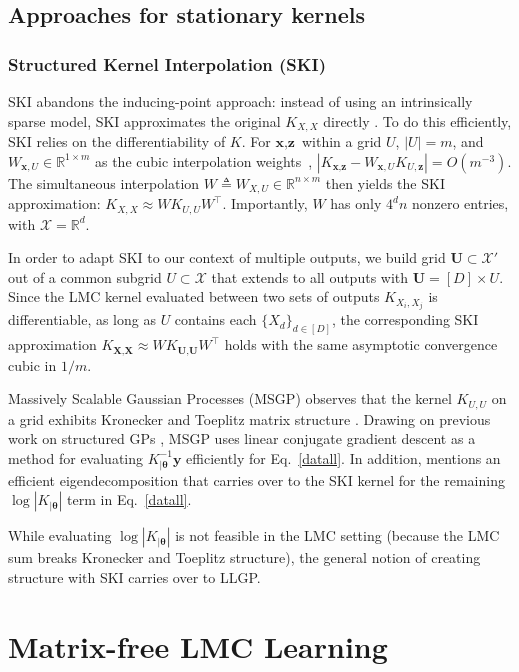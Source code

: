 \documentclass{article}
\def\bsth{{\boldsymbol\theta}}
\def \R {\mathbb{R}}
\def\Tx{\textbf{x}}
\def\TX{\textbf{X}}
\def\TU{\textbf{U}}
\def\Ty{\textbf{y}}
\def\Tz{\textbf{z}}
\newcommand{\card}[1]{\left\vert{#1}\right\vert}
\newcommand{\abs}[1]{\left|#1\right|}
\def \mcX {\mathcal{X}}
\begin{document}
\subsection{Approaches for stationary kernels}

\subsubsection{Structured Kernel Interpolation (SKI)}\label{ski-section}

SKI abandons the inducing-point approach: instead of using an intrinsically sparse model, SKI approximates the original $K_{X,X}$ directly \cite{kiss-gp}. To do this efficiently, SKI relies on the differentiability of $K$. For $\Tx,\Tz$ within a grid $U$, $\card{U}=m$, and $W_{\Tx,U}\in\R^{1\times m}$ as the cubic interpolation weights~\cite{keys1981cubic}, $\abs{K_{\Tx,\Tz}-W_{\Tx,U}K_{U,\Tz}}=O(m^{-3})$. The simultaneous interpolation $W\triangleq W_{X,U}\in\R^{n\times m}$ then yields the SKI approximation: $K_{X,X}\approx WK_{U,U}W^\top$. Importantly, $W$ has only $4^dn$ nonzero entries, with $\mcX=\R^d$.

In order to adapt SKI to our context of multiple outputs, we build grid $\TU\subset\mcX'$ out of a common subgrid $U\subset\mcX$ that extends to all outputs with $\TU = [D]\times U$. Since the LMC kernel evaluated between two sets of outputs $K_{X_i,X_j}$ is differentiable, as long as $U$ contains each $\{X_d\}_{d\in[D]}$, the corresponding SKI approximation $K_{\TX,\TX}\approx WK_{\TU,\TU}W^\top$ holds with the same asymptotic convergence cubic in $1/m$.

Massively Scalable Gaussian Processes (MSGP) observes that the kernel $K_{U,U}$ on a grid exhibits Kronecker and Toeplitz matrix structure \cite{msgp}. Drawing on previous work on structured GPs \cite{cunningham2008fast, gilboa2015scaling}, MSGP uses linear conjugate gradient descent as a method for evaluating $K_{|\bsth}^{-1}\Ty$ efficiently for Eq.~\ref{datall}. In addition, \cite{wilson2014fast} mentions an efficient eigendecomposition that carries over to the SKI kernel for the remaining $\log\abs{K_{|\bsth}}$ term in Eq.~\ref{datall}.

While evaluating $\log\abs{K_{|\bsth}}$ is not feasible in the LMC setting (because the LMC sum breaks Kronecker and Toeplitz structure), the general notion of creating structure with SKI carries over to LLGP.

\section{Matrix-free LMC Learning} \label{sec:matrix-free}
\end{document}

